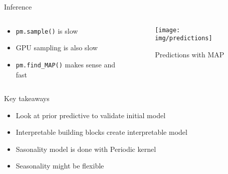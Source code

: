 \documentclass{beamer}
\begin{document}
\begin{frame}{Inference}
\begin{columns}
\begin{column}{0.5\linewidth}
\begin{itemize}
    \item \texttt{pm.sample()} is slow
    \item GPU sampling is also slow
    \item \texttt{pm.find\_MAP()} makes sense and fast
\end{itemize}
\end{column}
\begin{column}{0.5\linewidth}
\begin{figure}
    \centering
    \texttt{[image: img/predictions]}
    \caption{Predictions with MAP}
\end{figure}
\end{column}
\end{columns}
\end{frame}
\begin{frame}{Key takeaways}
    \begin{itemize}
        \item Look at prior predictive to validate initial model
        \item Interpretable building blocks create interpretable model
        \item Sasonality model is done with Periodic kernel
        \item Seasonality might be flexible
    \end{itemize}
\end{frame}
\end{document}
